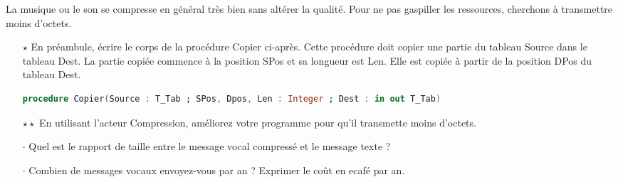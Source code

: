 

La musique ou le son se compresse en général très bien sans altérer la qualité.
Pour ne pas gaspiller les ressources, cherchons à transmettre moins d'octets.

\vfill

\begin{itemize}
\item[$\star$] En préambule, écrire le corps de la procédure Copier ci-après. Cette procédure doit copier une partie du tableau Source dans le tableau Dest.
  La partie copiée commence à la position SPos et sa longueur est Len. Elle est copiée à partir de la position DPos du tableau Dest.

  \begin{lstlisting}[language=Ada]
    procedure Copier(Source : T_Tab ; SPos, Dpos, Len : Integer ; Dest : in out T_Tab) 
  \end{lstlisting}
  
  \item[$\star\star$] En utilisant l'acteur Compression, améliorez votre programme pour qu'il transmette moins d'octets.
\end{itemize}

\begin{itemize}
\item[$\cdot$] Quel est le rapport de taille entre le message vocal compressé et le message texte ?
\item[$\cdot$] Combien de messages vocaux envoyez-vous par an ? Exprimer le coût en ecafé par an.
\end{itemize}






